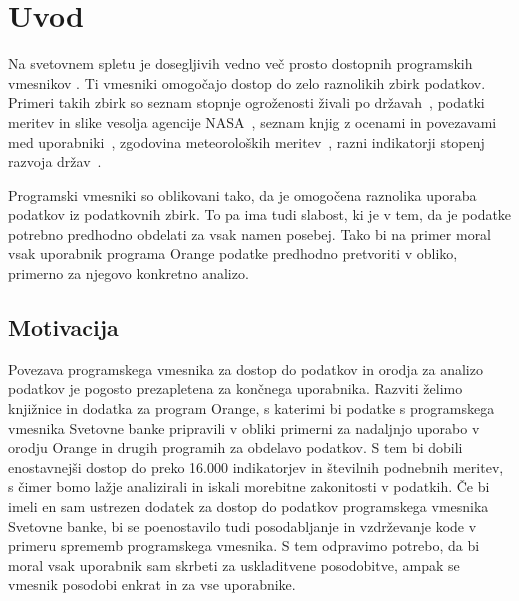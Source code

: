 
\chapter{Uvod}

Na svetovnem spletu je dosegljivih vedno več prosto dostopnih programskih
vmesnikov .
Ti vmesniki omogočajo dostop
do zelo raznolikih zbirk podatkov. Primeri takih zbirk so
seznam stopnje ogroženosti živali po državah~,
podatki meritev in slike vesolja agencije NASA~,
seznam knjig z ocenami in povezavami med uporabniki~,
zgodovina meteoroloških meritev~,
razni indikatorji stopenj razvoja držav~.
    

Programski vmesniki so oblikovani tako, da je omogočena raznolika uporaba
podatkov iz podatkovnih zbirk. To pa ima tudi slabost, ki je v tem, da je 
podatke potrebno predhodno obdelati za vsak namen posebej. Tako bi na primer 
moral vsak uporabnik programa Orange podatke predhodno pretvoriti v obliko, 
primerno za njegovo konkretno analizo.


\section{Motivacija}


Povezava programskega vmesnika za dostop do podatkov in orodja za analizo 
podatkov je pogosto prezapletena za končnega uporabnika. Razviti želimo
knjižnice in dodatka za program Orange, s katerimi bi podatke s programskega
vmesnika Svetovne banke pripravili v obliki primerni za nadaljnjo
uporabo v orodju Orange in drugih programih za obdelavo podatkov. S tem bi
dobili enostavnejši dostop do preko 16.000 indikatorjev in številnih podnebnih
meritev, s čimer bomo lažje analizirali in iskali morebitne zakonitosti v
podatkih. Če bi imeli en sam ustrezen dodatek za dostop do podatkov
programskega vmesnika Svetovne banke, bi se poenostavilo tudi posodabljanje in
vzdrževanje kode v primeru sprememb programskega vmesnika. S tem odpravimo
potrebo, da bi moral vsak uporabnik sam skrbeti za uskladitvene posodobitve,
ampak se vmesnik posodobi enkrat in za vse uporabnike.


